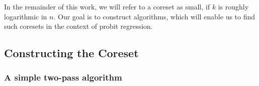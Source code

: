 In the remainder of this work, we will refer to a coreset as
small, if $k$ is roughly logarithmic in $n$.
Our goal is to construct algorithms, which will enable us to
find such coresets in the context of probit regression.





\subsection{Constructing the Coreset}





\subsubsection{A simple two-pass algorithm}

